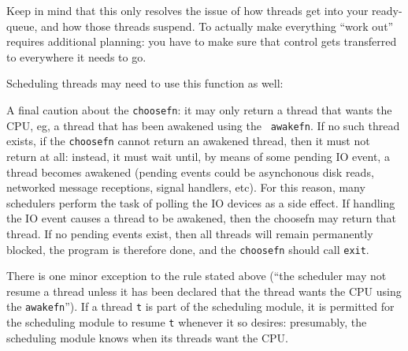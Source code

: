 Keep in mind that this only resolves the issue of how threads get into
your ready-queue, and how those threads suspend.  To actually make
everything ``work out'' requires additional planning: you have to make
sure that control gets transferred to everywhere it needs to go.

Scheduling threads may need to use this function as well:


A final caution about the {\tt choosefn}: it may only return a thread
that wants the CPU, eg, a thread that has been awakened using the {\tt
awakefn}.  If no such thread exists, if the {\tt choosefn} cannot
return an awakened thread, then it must not return at all: instead, it
must wait until, by means of some pending IO event, a thread becomes
awakened (pending events could be asynchonous disk reads, networked
message receptions, signal handlers, etc).  For this reason, many
schedulers perform the task of polling the IO devices as a side
effect.  If handling the IO event causes a thread to be awakened, then
the choosefn may return that thread.  If no pending events exist, then
all threads will remain permanently blocked, the program is therefore
done, and the {\tt choosefn} should call {\tt exit}.

There is one minor exception to the rule stated above (``the scheduler
may not resume a thread unless it has been declared that the thread
wants the CPU using the {\tt awakefn}'').  If a thread {\tt t} is part
of the scheduling module, it is permitted for the scheduling module to
resume {\tt t} whenever it so desires: presumably, the scheduling
module knows when its threads want the CPU.

